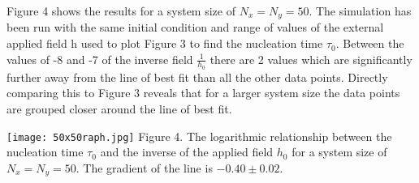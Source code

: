 \documentclass{article}
\begin{document}
\begin{multicols*}{2}
Figure 4 shows the results for a system size of $N_{x}=N_{y}=50$. The simulation has been run with the same initial condition and range of values of the external applied field h used to plot Figure 3 to find the nucleation time $\tau_{0}$. Between the values of -8 and -7 of the inverse field $\frac{1}{h_{0}}$ there are 2 values which are significantly further away from the line of best fit than all the other data points. Directly comparing this to Figure 3 reveals that for a larger system size the data points are grouped closer around the line of best fit. 
\newline
\begin{Figure}
\centering
\texttt{[image: 50x50raph.jpg]}
\footnotesize
Figure 4. The logarithmic relationship between the nucleation time $\tau_{0}$ and the inverse of the applied field $h_{0}$ for a system size of $N_{x}=N_{y}=50$. The gradient of the line is $-0.40 \pm 0.02$.
\end{Figure}
\normalsize
\newline
\newline


\end{multicols*}
\end{document}
